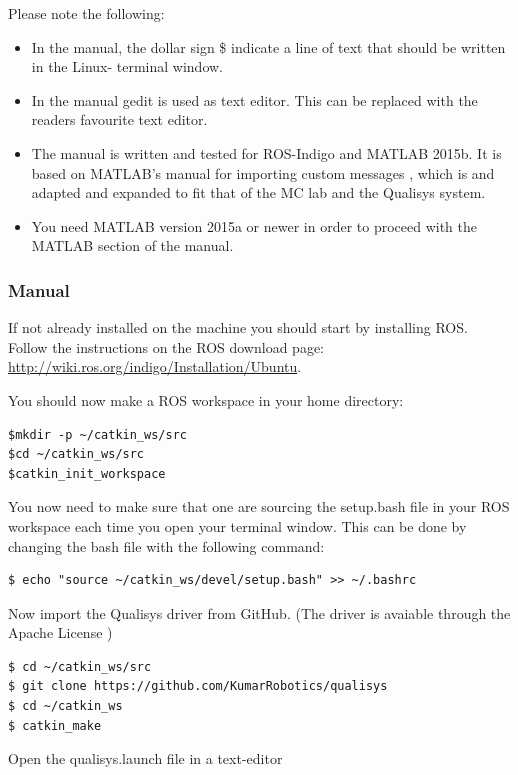 \documentclass[a4paper,english]{report}
\begin{document}
Please note the following: 
\begin{itemize}
	\item In the manual, the dollar sign \$ indicate a line of text that should be written in the Linux- terminal window.
	\item In the manual gedit is used as text editor. This can be replaced with the readers favourite text editor.
	\item The manual is written and tested for ROS-Indigo and MATLAB 2015b. It is based on MATLAB's manual for importing custom messages \citep{MathWorks2016}, which is and adapted and expanded to fit that of the MC lab and the Qualisys system.
	\item You need MATLAB version 2015a or newer in order to proceed with the MATLAB section of the manual.
\end{itemize}

\subsubsection{Manual}
If not already installed on the machine you should start by installing ROS. Follow the instructions on the ROS download page: \url{http://wiki.ros.org/indigo/Installation/Ubuntu}.

You should now make a ROS workspace in your home directory:

\begin{verbatim}$mkdir -p ~/catkin_ws/src 
$cd ~/catkin_ws/src
$catkin_init_workspace\end{verbatim}

You now need to make sure that one are sourcing the setup.bash file in your ROS workspace each time you open your terminal window. This can be done by changing the bash file with the following command:

\begin{verbatim}$ echo "source ~/catkin_ws/devel/setup.bash" >> ~/.bashrc\end{verbatim}

Now import the Qualisys driver from GitHub. (The driver \citep{KumarRobotics2016} is avaiable through the Apache License )

\begin{verbatim}$ cd ~/catkin_ws/src
$ git clone https://github.com/KumarRobotics/qualisys
$ cd ~/catkin_ws
$ catkin_make\end{verbatim}

Open the qualisys.launch file in a text-editor
\end{document}
